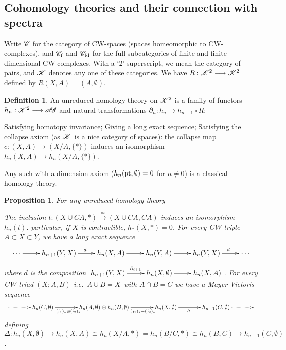 \documentclass[11pt]{article}
\renewcommand{\comment}{}
\theoremstyle{plain}
\newtheorem{prop}[thm]{Proposition}
\theoremstyle{definition}
\newtheorem{defn}[thm]{Definition}
\newcommand{\CW}{\scrC}
\newcommand{\AG}{\scrA\!\scrG}
\newcommand{\CWf}{\scrC_\textup{f}}
\newcommand{\CWfd}{\scrC_\textup{fd}}
\begin{document}
\subsection{\lparen Co\rparen homology theories and their connection with
spectra}
\comment{
Write $\CW$ for the category of CW-spaces (spaces homeomorphic to CW-complexes),
and $\CWf$ and $\CWfd$ for the full subcategories of finite and finite
dimensional CW-complexes. With a `2' superscript, we mean the category of pairs,
and $\mathscr{K}$ denotes any one of these categories. We have $R:\mathscr{K}^2\longrightarrow\mathscr{K}^2$
defined by $R(X,A)=(A,\emptyset)$.
\begin{defn}
An unreduced homology theory on $\mathscr{K}^2$ is a family of functors
$h_n:\scrK^2\to\AG$ and natural transformations $\partial_n:h_n\to h_{n-1}\circ
R$:
\begin{itemise}
\itm Satisfying homotopy invariance;
\itm Giving a long exact sequence;
\itm Satisfying the collapse axiom (as $\mathscr{K}$ is a nice category of spaces):
the collapse map $c:(X,A)\to (X/A,\{*\})$ induces an isomorphism $h_n(X,A)\to
h_n(X/A,\{*\})$.
\end{itemise}
\end{defn}
\noindent Any such with a dimension axiom ($h_n(\textup{pt},\emptyset)=0$ for
$n\neq0$) is a classical homology theory.
\begin{prop}For any unreduced homology theory\upcol
\begin{itemise}
\itm The inclusion $t:(X\cup CA,*)\xrightarrow{\ \simeq\ }(X\cup CA,CA)$ induces
an isomorphism $h_n(t)$.
particular, if $X$ is contractible, $h_*(X,*)=0$.
\itm For every CW-triple $A\subset X\subset Y$, we have a long exact
sequence\upcol
\[\xymatrix{
\cdots\ar[r]&
h_{n+1}(Y,X)\ar[r]^d&h_{n}(X,A)\ar[r]&
h_{n}(Y,A)\ar[r]&h_{n}(Y,X)\ar[r]^{\ \ d}&\cdots
}\]
where $d$ is the composition $\xymatrix{h_{n+1}(Y,X)\ar[r]^{\ \ \partial_{i+1}}&
h_n(X,\emptyset)\ar[r]&h_n(X,A)}$.
\itm For every CW-triad $(X;A,B)$ \lparen i.e.\ $A\cup B=X$\rparen\ with $A\cap
B=C$ we have a Mayer-Vietoris sequence\upcol
\[\xymatrix@C=1.3cm{
\ar@{.>}[r]&
h_{n}(C,\emptyset)\ar[r]_{(i_1)_*\oplus (i_2)_*\ \ \ \ \ }&
h_{n}(A,\emptyset)\oplus h_n(B,\emptyset)\ar[r]_{\qquad \ \ (j_1)_*-(j_2)_*}&
h_{n}(X,\emptyset)\ar[r]_{\Delta\ \ }&h_{n-1}(C,\emptyset)\ar@{.>}[r]&
}\]
defining $\Delta:h_n(X,\emptyset)\to h_n(X,A)\cong
h_n(X/A,*)=h_n(B/C,*)\cong h_n(B,C)\to h_{n-1}(C,\emptyset)$.
\end{itemise}
\end{prop}
}
\end{document}
